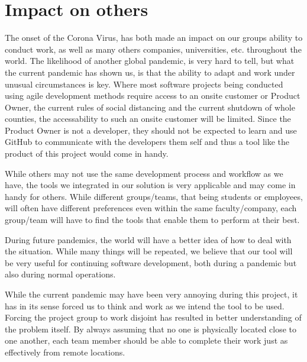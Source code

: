 \section{Impact on others}

The onset of the Corona Virus, has both made an impact on our groups ability to conduct work, as well as many others companies, universities, etc. throughout the world.
The likelihood of another global pandemic, is very hard to tell, but what the current pandemic has shown us, is that the ability to adapt and work under unusual circumstances is key.
Where most software projects being conducted using agile development methods require access to an onsite customer or Product Owner, the current rules of social distancing and the current shutdown of whole counties, the accessability to such an onsite customer will be limited.
Since the Product Owner is not a developer, they should not be expected to learn and use GitHub to communicate with the developers them self and thus a tool like the product of this project would come in handy.

While others may not use the same development process and workflow as we have, the tools we integrated in our solution is very applicable and may come in handy for others.
While different groups/teams, that being students or employees, will often have different preferences even within the same faculty/company, each group/team will have to find the tools that enable them to perform at their best.

During future pandemics, the world will have a better idea of how to deal with the situation.
While many things will be repeated, we believe that our tool will be very useful for continuing software development, both during a pandemic but also during normal operations.

While the current pandemic may have been very annoying during this project, it has in its sense forced us to think and work as we intend the tool to be used.
Forcing the project group to work disjoint has resulted in better understanding of the problem itself.
By always assuming that no one is physically located close to one another, each team member should be able to complete their work just as effectively from remote locations.
